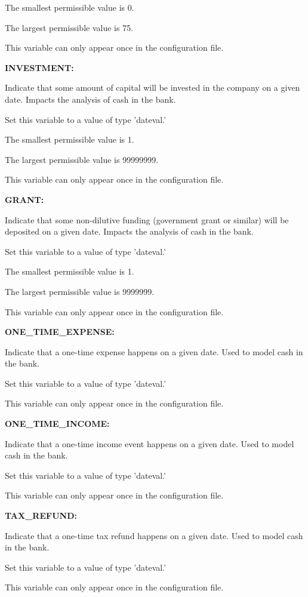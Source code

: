 The smallest permissible value is 0.

The largest permissible value is 75.

This variable can only appear once in the configuration file.


\textbf{INVESTMENT:}


Indicate that some amount of capital will be invested in the company on a given date.  Impacts the analysis of cash in the bank.

Set this variable to a value of type 'dateval.'

The smallest permissible value is 1.

The largest permissible value is 99999999.

This variable can only appear once in the configuration file.


\textbf{GRANT:}


Indicate that some non-dilutive funding (government grant or similar) will be deposited on a given date.  Impacts the analysis of cash in the bank.

Set this variable to a value of type 'dateval.'

The smallest permissible value is 1.

The largest permissible value is 9999999.

This variable can only appear once in the configuration file.


\textbf{ONE\_TIME\_EXPENSE:}


Indicate that a one-time expense happens on a given date.  Used to model cash in the bank.

Set this variable to a value of type 'dateval.'

This variable can only appear once in the configuration file.


\textbf{ONE\_TIME\_INCOME:}


Indicate that a one-time income event happens on a given date.  Used to model cash in the bank.

Set this variable to a value of type 'dateval.'

This variable can only appear once in the configuration file.


\textbf{TAX\_REFUND:}


Indicate that a one-time tax refund happens on a given date.  Used to model cash in the bank.

Set this variable to a value of type 'dateval.'

This variable can only appear once in the configuration file.


